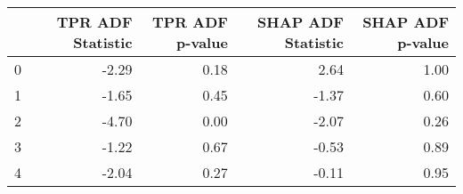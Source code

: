 \begin{tabular}{lrrrr}
\toprule
 & TPR ADF Statistic & TPR ADF p-value & SHAP ADF Statistic & SHAP ADF p-value \\
\midrule
0 & -2.29 & 0.18 & 2.64 & 1.00 \\
1 & -1.65 & 0.45 & -1.37 & 0.60 \\
2 & -4.70 & 0.00 & -2.07 & 0.26 \\
3 & -1.22 & 0.67 & -0.53 & 0.89 \\
4 & -2.04 & 0.27 & -0.11 & 0.95 \\
\bottomrule
\end{tabular}

